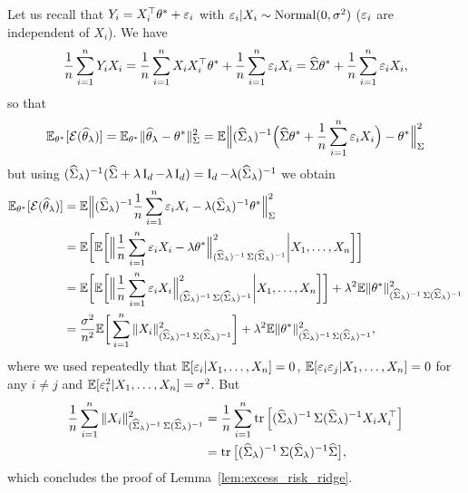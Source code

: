 Let us recall that $Y_i = X_i^\top \theta^* + \eps_i$ with $\eps_i | X_i \sim \nor(0, \sigma^2)$ ($\eps_i$ are independent of $X_i$).
We have
\begin{equation*}
	\frac 1n \sum_{i=1}^n Y_i X_i = \frac 1n \sum_{i=1}^n X_i X_i^\top \theta^* 
	+ \frac 1n \sum_{i=1}^n \eps_i X_i = \wh \bSigma \theta^* + \frac 1n \sum_{i=1}^n \eps_i X_i,
\end{equation*}
so that
\begin{equation*}
	\E_{\theta^*} [\cE(\wh \theta_\lambda)] 
	=  \E_{\theta^*} \norm{\wh \theta_\lambda - \theta^*}_{\bSigma}^2 
	= \E \Big\| (\wh \bSigma_\lambda)^{-1} \Big(\wh \bSigma \theta^* + \frac 1n \sum_{i=1}^n \eps_i X_i \Big) - \theta^* \Big\|_{\bSigma}^2 
\end{equation*}
but using $(\wh \bSigma_\lambda)^{-1} (\wh \bSigma + \lambda \bI_d - \lambda \bI_d) = \bI_d - \lambda 
(\wh \bSigma_\lambda)^{-1}$ we obtain
\begin{align*}
	\E_{\theta^*} [\cE(\wh \theta_\lambda)] &= \E \Big\| (\wh \bSigma_\lambda)^{-1} \frac 1n \sum_{i=1}^n \eps_i X_i - \lambda (\wh \bSigma_\lambda)^{-1} \theta^* \Big\|_{\bSigma}^2 \\
	&= \E \bigg[ \E \bigg[ \Big\| \frac 1n \sum_{i=1}^n \eps_i X_i - \lambda \theta^* \Big\|_{(\wh \bSigma_\lambda)^{-1} \bSigma (\wh \bSigma_\lambda)^{-1}}^2 \bigg| X_1, \ldots, X_n \bigg] \bigg] \\
	&= \E \bigg[ \E \bigg[ \Big\| \frac 1n \sum_{i=1}^n \eps_i X_i \Big\|_{(\wh \bSigma_\lambda)^{-1} \bSigma (\wh \bSigma_\lambda)^{-1}}^2 \bigg| X_1, \ldots, X_n \bigg] \bigg]  + \lambda^2 \E \norm{\theta^*}_{(\wh \bSigma_\lambda)^{-1} \bSigma (\wh \bSigma_\lambda)^{-1}}^2 \\
	&= \frac{\sigma^2}{n^2} \E \bigg[ \sum_{i=1}^n \norm{X_i}_{(\wh \bSigma_\lambda)^{-1} \bSigma (\wh \bSigma_\lambda)^{-1}}^2 \bigg]  + \lambda^2 \E \norm{\theta^*}_{(\wh \bSigma_\lambda)^{-1} \bSigma (\wh \bSigma_\lambda)^{-1}}^2,
\end{align*}
where we used repeatedly that $\E[\eps_i | X_1, \ldots, X_n] = 0$, $\E[\eps_i \eps_j | X_1, \ldots, X_n] = 0$ for any $i \neq j$ and $\E[\eps_i^2 | X_1, \ldots, X_n] = \sigma^2$.
But 
\begin{align*}
	\frac 1n \sum_{i=1}^n \norm{X_i}_{(\wh \bSigma_\lambda)^{-1} \bSigma (\wh \bSigma_\lambda)^{-1}}^2 
	&= \frac 1n \sum_{i=1}^n \tr \Big[ (\wh \bSigma_\lambda)^{-1} \bSigma (\wh \bSigma_\lambda)^{-1} X_i X_i^\top \Big] \\
	&= \tr \big[ (\wh \bSigma_\lambda)^{-1} \bSigma (\wh \bSigma_\lambda)^{-1} \wh \bSigma \big],
\end{align*}
which concludes the proof of Lemma~\ref{lem:excess_risk_ridge}.

